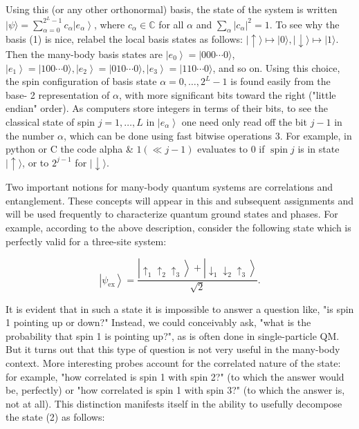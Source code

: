 \documentclass[12pt]{article}
\begin{document}
Using this (or any other orthonormal) basis, the state of the system is written $|\psi\rangle=\sum_{\alpha=0}^{2^{L}-1} c_{\alpha}\left|e_{\alpha}\right\rangle$, where $c_{\alpha} \in \mathbb{C}$ for all $\alpha$ and $\sum_{\alpha}\left|c_{\alpha}\right|^{2}=1$. To see why the basis (1) is nice, relabel the local basis states as follows: $|\uparrow\rangle \mapsto|0\rangle,|\downarrow\rangle \mapsto|1\rangle$. Then the many-body basis states are $\left|e_{0}\right\rangle=|000 \cdots 0\rangle$, $\left|e_{1}\right\rangle=|100 \cdots 0\rangle,\left|e_{2}\right\rangle=|010 \cdots 0\rangle,\left|e_{3}\right\rangle=|110 \cdots 0\rangle$, and so on. Using this choice, the spin configuration of basis state $\alpha=0, \ldots, 2^{L}-1$ is found easily from the base- 2 representation of $\alpha$, with more significant bits toward the right ("little endian" order). As computers store integers in terms of their bits, to see the classical state of spin $j=1, \ldots, L$ in $\left|e_{\alpha}\right\rangle$ one need only read off the bit $j-1$ in the number $\alpha$, which can be done using fast bitwise operations 3. For example, in python or $\mathrm{C}$ the code alpha \& $1(\ll j-1)$ evaluates to 0 if $\operatorname{spin} j$ is in state $|\uparrow\rangle$, or to $2^{j-1}$ for $|\downarrow\rangle$.

Two important notions for many-body quantum systems are correlations and entanglement. These concepts will appear in this and subsequent assignments and will be used frequently to characterize quantum ground states and phases. For example, according to the above description, consider the following state which is perfectly valid for a three-site system:


\begin{equation*}
\left|\psi_{\mathrm{ex}}\right\rangle=\frac{\left|\uparrow_{1} \uparrow_{2} \uparrow_{3}\right\rangle+\left|\downarrow_{1} \downarrow_{2} \uparrow_{3}\right\rangle}{\sqrt{2}} . \tag{2}
\end{equation*}


It is evident that in such a state it is impossible to answer a question like, "is spin 1 pointing up or down?" Instead, we could conceivably ask, "what is the probability that spin 1 is pointing up?", as is often done in single-particle QM. But it turns out that this type of question is not very useful in the many-body context. More interesting probes account for the correlated nature of the state: for example, "how correlated is spin 1 with spin 2?" (to which the answer would be, perfectly) or "how correlated is spin 1 with spin 3?" (to which the answer is, not at all). This distinction manifests itself in the ability to usefully decompose the state (2) as follows:
\end{document}
